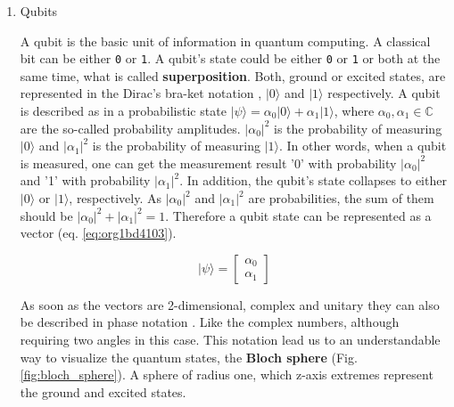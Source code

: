 \begin{enumerate}
\item Qubits
\label{sec:org6bb5ea6}

A qubit is the basic unit of information in quantum computing.
A classical bit can be either \texttt{0} or \texttt{1}.
A qubit's state could be either \texttt{0} or \texttt{1} or both at the same time, what is called \textbf{superposition}.
Both, ground or excited states, are represented in the Dirac's bra-ket notation \cite{Nielsen_2009}, \(| 0 \rangle\) and \(| 1 \rangle\) respectively.
A qubit is described as in a probabilistic state \(| \psi \rangle = \alpha_0 | 0 \rangle + \alpha_1 | 1 \rangle\), where \(\alpha_0, \alpha_1 \in \mathbb{C}\) are the so-called probability amplitudes.
\(|\alpha_0|^2\) is the probability of measuring \(| 0 \rangle\) and \(|\alpha_1|^2\) is the probability of measuring \(| 1 \rangle\).
In other words, when a qubit is measured, one can get the measurement result '0' with probability \(|\alpha_0|^2\) and '1' with probability \(|\alpha_1|^2\).
In addition, the qubit's state collapses to either \(| 0 \rangle\) or \(| 1 \rangle\), respectively.
As \(|\alpha_0|^2\) and \(|\alpha_1|^2\)  are probabilities, the sum of them should be \(|\alpha_0|^2 + |\alpha_1|^2 = 1\).
Therefore a qubit state can be represented as a vector (eq. \ref{eq:org1bd4103}).

\begin{equation}
\label{eq:org1bd4103}
|\psi\rangle = \begin{bmatrix}\alpha_0 \\ \alpha_1 \end{bmatrix}
\end{equation}

As soon as the vectors are 2-dimensional, complex and unitary they can also be described in phase notation \cite{Nielsen_2009}.
Like the complex numbers, although requiring two angles in this case.
This notation lead us to an understandable way to visualize the quantum states, the \textbf{Bloch sphere} (Fig. \ref{fig:bloch_sphere}).
A sphere of radius one, which z-axis extremes represent the ground and excited states.


\end{enumerate}
